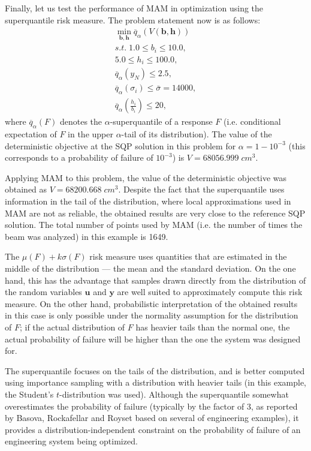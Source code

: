 \documentclass{llncs}
\begin{document}
Finally, let us test the performance of MAM in optimization using the superquantile risk measure. The problem statement now is as follows:
\begin{displaymath}
  \begin{array}{c}
    \min\limits_{\pmb b, \pmb h} \overline{q}_\alpha \left(V(\pmb b, \pmb h)\right) \\
    s.t.\;1.0 \le b_i \le 10.0, \\
    5.0 \le h_i \le 100.0, \\    
		\overline{q}_\alpha \left(y_N\right) \le 2.5, \\
    \overline{q}_\alpha \left(\sigma_i\right) \le \bar{\sigma} = 14000, \\
    \overline{q}_\alpha \left(\frac{h_i}{b_i}\right)\le 20,
  \end{array}
\end{displaymath}
where $\overline{q}_\alpha \left(F\right) $ denotes the $\alpha$-superquantile of a response $F$ (i.e. conditional expectation of $F$ in the upper $\alpha$-tail of its distribution). The value of the deterministic objective at the SQP solution in this problem for $\alpha = 1-10^{-3}$ (this corresponds to a probability of failure of $10^{-3}$) is $V = 68056.999\; cm^3$.

Applying MAM to this problem, the value of the deterministic objective was obtained as $V = 68200.668\; cm^3$. Despite the fact that the superquantile uses information in the tail of the distribution, where local approximations used in MAM are not as reliable, the obtained results are very close to the reference SQP solution. The total number of  points used by MAM (i.e. the number of times the beam was analyzed) in this example is 1649.

The $\mu(F ) + k\sigma(F)$ risk measure uses quantities that are estimated in the middle of the distribution --- the mean and the standard deviation. On the one hand, this has the advantage that samples drawn directly from the distribution of the random variables $\pmb u$ and $\pmb y$ are well suited to approximately compute this risk measure. On the other hand, probabilistic interpretation of the obtained results in this case is only possible under the normality assumption for the distribution of $F$; if the actual distribution of $F$ has heavier tails than the normal one, the actual probability of failure will be higher than the one  the system was designed for.

The superquantile focuses on the tails of the distribution, and is better computed using importance sampling with a distribution with heavier tails (in this example, the Student's $t$-distribution was used). Although the superquantile somewhat overestimates the probability of failure (typically by the factor of 3, as reported by Basova, Rockafellar and Royset \cite{BasovaRockafellarRoyset} based on several of engineering examples), it provides a distribution-independent constraint on the probability of failure of an engineering system being optimized.
\end{document}

